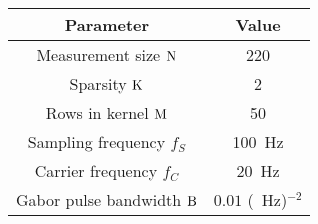 \begin{tabular}{ | c | c | } 
\hline
Parameter & Value \\
\hline 
Measurement size $\operatorname{N}$ & 220\\
\hline
Sparsity $\operatorname{K}$ & 2\\
\hline
Rows in kernel $\operatorname{M}$ & 50\\
\hline
Sampling frequency $f_S$ & \SI{100}{\hertz} \\
\hline
Carrier frequency $f_{C}$ & \SI{20}{\hertz}\\
\hline
Gabor pulse bandwidth $\operatorname{B}$ & $0.01$ (\SI{}{\hertz})$^{-2}$ \\
\hline
\end{tabular}

